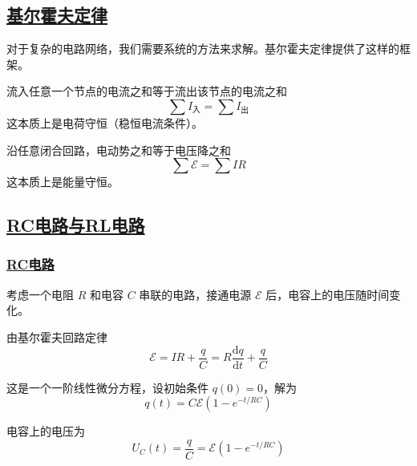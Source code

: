 \subsection{\protect\hyperlink{:}{基尔霍夫定律}}

对于复杂的电路网络，我们需要系统的方法来求解。基尔霍夫定律提供了这样的框架。

\begin{theorem}
    流入任意一个节点的电流之和等于流出该节点的电流之和
    \begin{equation}
        \sum I_{\text{入}} = \sum I_{\text{出}}
    \end{equation}
    这本质上是电荷守恒（稳恒电流条件）。
\end{theorem}

\begin{theorem}
    沿任意闭合回路，电动势之和等于电压降之和
    \begin{equation}
        \sum \mathcal{E} = \sum IR
    \end{equation}
    这本质上是能量守恒。
\end{theorem}

\subsection{\protect\hyperlink{:}{RC电路与RL电路}}

\subsubsection{\protect\hyperlink{:}{RC电路}}

考虑一个电阻 $R$ 和电容 $C$ 串联的电路，接通电源 $\mathcal{E}$ 后，电容上的电压随时间变化。

由基尔霍夫回路定律
\begin{equation}
    \mathcal{E} = IR + \frac{q}{C} = R\frac{\mathrm{d}q}{\mathrm{d}t} + \frac{q}{C}
\end{equation}

这是一个一阶线性微分方程，设初始条件 $q(0) = 0$，解为
\begin{equation}
    q(t) = C\mathcal{E}\left(1 - e^{-t/RC}\right)
\end{equation}

电容上的电压为
\begin{equation}
    U_C(t) = \frac{q}{C} = \mathcal{E}\left(1 - e^{-t/RC}\right)
\end{equation}

